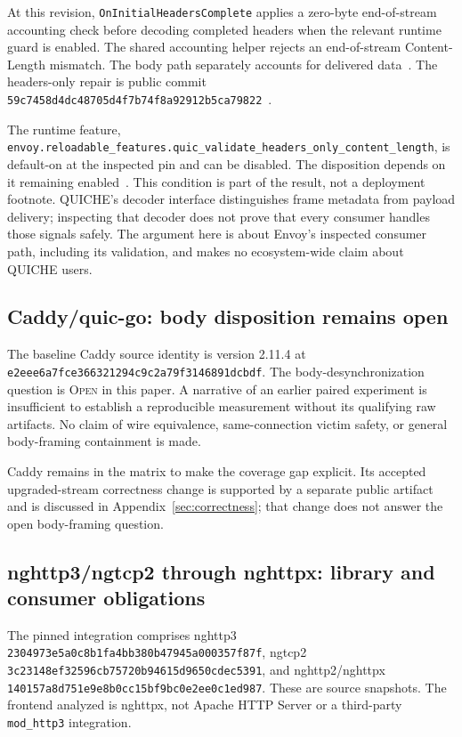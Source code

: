 \documentclass[11pt,letterpaper]{article}
\newcommand{\code}[1]{\nolinkurl{#1}}
\newcommand{\state}[1]{\textsc{#1}}
\begin{document}
At this revision, \code{OnInitialHeadersComplete} applies a zero-byte end-of-stream accounting check before decoding completed headers when the relevant runtime guard is enabled. The shared accounting helper rejects an end-of-stream Content-Length mismatch. The body path separately accounts for delivered data~\cite{envoysource,envoyhelper}. The headers-only repair is public commit \code{59c7458d4dc48705d4f7b74f8a92912b5ca79822}~\cite{envoyfix}.

The runtime feature, \nolinkurl{envoy.reloadable_features.quic_validate_headers_only_content_length}, is default-on at the inspected pin and can be disabled. The disposition depends on it remaining enabled~\cite{envoyruntime}. This condition is part of the result, not a deployment footnote. QUICHE's decoder interface distinguishes frame metadata from payload delivery; inspecting that decoder does not prove that every consumer handles those signals safely. The argument here is about Envoy's inspected consumer path, including its validation, and makes no ecosystem-wide claim about QUICHE users.

\subsection{Caddy/quic-go: body disposition remains open}
The baseline Caddy source identity is version 2.11.4 at \code{e2eee6a7fce366321294c9c2a79f3146891dcbdf}. The body-desynchronization question is \state{Open} in this paper. A narrative of an earlier paired experiment is insufficient to establish a reproducible measurement without its qualifying raw artifacts. No claim of wire equivalence, same-connection victim safety, or general body-framing containment is made.

Caddy remains in the matrix to make the coverage gap explicit. Its accepted upgraded-stream correctness change is supported by a separate public artifact and is discussed in Appendix~\ref{sec:correctness}; that change does not answer the open body-framing question.

\subsection{nghttp3/ngtcp2 through nghttpx: library and consumer obligations}
The pinned integration comprises nghttp3 \code{2304973e5a0c8b1fa4bb380b47945a000357f87f}, ngtcp2 \code{3c23148ef32596cb75720b94615d9650cdec5391}, and nghttp2/nghttpx \code{140157a8d751e9e8b0cc15bf9bc0e2ee0c1ed987}. These are source snapshots. The frontend analyzed is nghttpx, not Apache HTTP Server or a third-party \code{mod_http3} integration.
\end{document}
